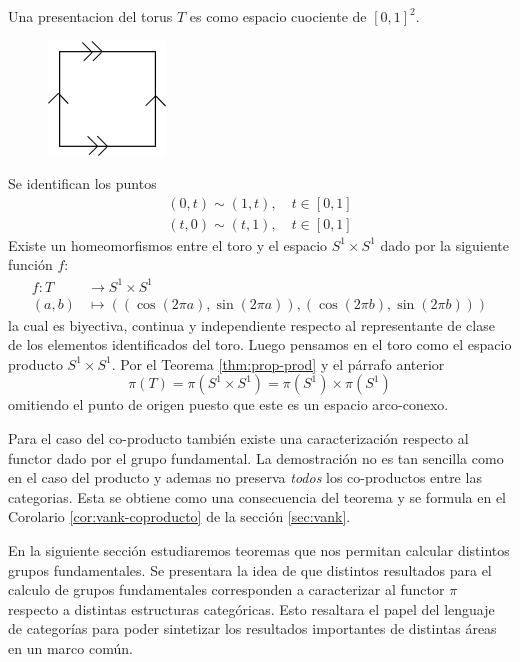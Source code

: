 \begin{ejemplo}[Toro] \label{ej:toro-presentacion}
  Una presentacion del torus \(T\) es como espacio cuociente de
  \([0,1]^2\).
  \begin{figure}[h]
    \centering \includegraphics[scale=0.5]{./imagenes/toro.png}
  \end{figure}
  Se identifican los puntos
  \begin{gather*}
    (0,t) \sim (1,t), \quad t \in [0,1] \\
    (t,0) \sim (t,1), \quad t \in [0,1]
  \end{gather*}
  Existe un homeomorfismos entre el toro y el espacio \(S^1 \times S^1\)
  dado por la siguiente función \(f\):
  \begin{align*}
    f : T &\longrightarrow S^1 \times S^1 \\
    (a,b) &\longmapsto \left( \left( \cos (2 \pi a) , \sin (2 \pi a) \right), \left( \cos (2 \pi b) , \sin (2 \pi b) \right) \right)
  \end{align*}
  la cual es biyectiva, continua y independiente respecto al
  representante de clase de los elementos identificados del toro. Luego
  pensamos en el toro como el espacio producto \(S^1 \times S^1\). Por
  el Teorema \ref{thm:prop-prod} y el párrafo anterior
  \[
    \pi \left( T \right) = \pi \left( S^1 \times S^1 \right) = \pi (S^1)
    \times \pi (S^1)
  \]
  omitiendo el punto de origen puesto que este es un espacio
  arco-conexo.
\end{ejemplo}

Para el caso del co-producto también existe una caracterización respecto
al functor dado por el grupo fundamental. La demostración no es tan
sencilla como en el caso del producto y ademas no preserva \emph{todos}
los co-productos entre las categorias. Esta se obtiene como una consecuencia
del teorema \vank y se formula en el Corolario \ref{cor:vank-coproducto} de
la sección \ref{sec:vank}.

En la siguiente sección estudiaremos teoremas que nos permitan calcular
distintos grupos fundamentales. Se presentara la idea de que distintos
resultados para el calculo de grupos fundamentales corresponden a
caracterizar al functor \(\pi\) respecto a distintas estructuras
categóricas. Esto resaltara el papel del lenguaje de categorías para
poder sintetizar los resultados importantes de distintas áreas en un
marco común.
